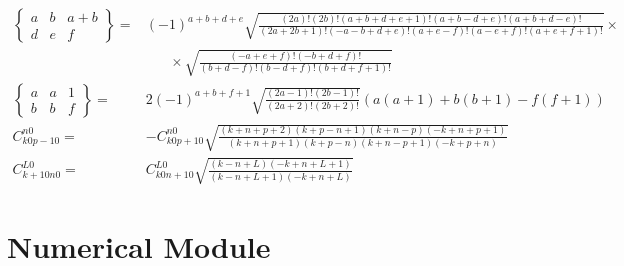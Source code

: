 \documentclass[times]{aastex631}
\begin{document}
\begin{align}
  \begin{Bmatrix} a & b & a+b \\ d & e & f\end{Bmatrix} = & (-1)^{a+b+d+e} \sqrt{\frac{(2a)!(2b)!(a+b+d+e+1)!(a+b-d+e)!(a+b+d-e)!}{(2a+2b+1)!(-a-b+d+e)!(a+e-f)!(a-e+f)!(a+e+f+1)!}}\times\nonumber\\
    & \;\;\;\;\;\;\times\sqrt{\frac{(-a+e+f)!(-b+d+f)!}{(b+d-f)!(b-d+f)!(b+d+f+1)!}}
    \\
  \begin{Bmatrix} a & a & 1 \\ b & b & f\end{Bmatrix} = & 2(-1)^{a+b+f+1}\sqrt{\frac{(2a-1)!(2b-1)!}{(2a+2)!(2b+2)!}}(a(a+1)+b(b+1)-f(f+1))\\
  C_{k 0 p-1 0}^{n 0} = & -C_{k 0 p+1 0}^{n 0}\sqrt{\frac{(k+n+p+2)(k+p-n+1)(k+n-p)(-k+n+p+1)}{(k+n+p+1)(k+p-n)(k+n-p+1)(-k+p+n)}}\\
  C_{k+1 0 n 0}^{L 0} = & C_{k 0 n+1 0}^{L 0}\sqrt{\frac{(k-n+L)(-k+n+L+1)}{(k-n+L+1)(-k+n+L)}}
\end{align}

\section{Numerical Module}







\end{document}
